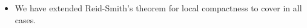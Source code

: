 \documentclass[preview]{standalone}
\begin{document}
\begin{center}
\begin{itemize} \item We have extended Reid-Smith's theorem for local compactness to cover in all cases.\end{itemize}
\end{center}
\end{document}
